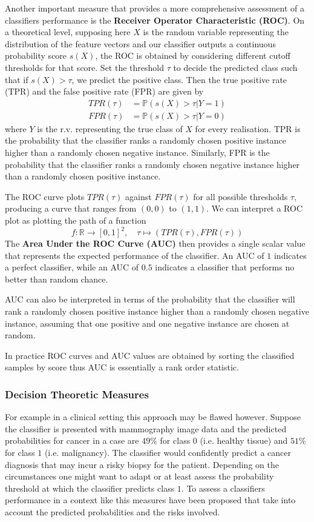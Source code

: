 Another important measure that provides a more comprehensive assessment of a classifiers performance is the \textbf{Receiver Operator Characteristic (ROC)}.
On a theoretical level, supposing here $X$ is the random variable representing the distribution of the feature vectors 
and our classifier outputs a continuous probability score $s(X)$, the ROC is obtained by considering different cutoff thresholds for that score.
Set the threshold $\tau$ to decide the predicted class such that if $s(X) > \tau$, we predict the positive class. 
Then the true positive rate (TPR) and the false positive rate (FPR) are given by
\[
    	\begin{aligned}
    		TPR(\tau) &= \mathbb{P}(s(X) > \tau | Y = 1) \\
    		FPR(\tau) &= \mathbb{P}(s(X) > \tau | Y = 0)
    	\end{aligned}
\]
where $Y$ is the r.v. representing the true class of $X$ for every realisation. 
TPR is the probability that the classifier ranks a randomly chosen positive instance higher than a randomly chosen negative instance. 
Similarly, FPR is the probability that the classifier ranks a randomly chosen negative instance higher than a randomly chosen positive instance.
    
The ROC curve plots $TPR(\tau)$ against $FPR(\tau)$ for all possible thresholds $\tau$, producing a curve that ranges from $(0,0)$ to $(1,1)$.
We can interpret a ROC plot as plotting the path of a function
\[
	f: \mathbb{R} \to [0,1]^2, \quad  \tau \mapsto (TPR(\tau), FPR(\tau))
\]
The \textbf{Area Under the ROC Curve (AUC)} then provides a single scalar value that represents the expected performance of the classifier.
An AUC of $1$ indicates a perfect classifier, while an AUC of $0.5$ indicates a classifier that performs no better than random chance.

AUC can also be interpreted in terms of the probability that the classifier will rank a randomly chosen positive instance higher than a randomly chosen negative instance,
assuming that one positive and one negative instance are chosen at random.

In practice ROC curves and AUC values are obtained by sorting the classified samples by score thus AUC is essentially a rank order statistic.


\subsubsection{Decision Theoretic Measures}
For example in a clinical setting this approach may be flawed however. 
Suppose the classifier is presented with mammography image data and the predicted probabilities for cancer in a case are $49\%$ for class $0$ (i.e. healthy tissue)
and $51\%$ for class $1$ (i.e. malignancy). The classifier would confidently predict a cancer diagnosis that may incur a risky biopsy for the patient.
Depending on the circumstances one might want to adapt or at least assess the probability threshold at which the classifier predicts class $1$.
To assess a classifiers performance in a context like this measures have been proposed that take into account the predicted probabilities and the risks involved.

